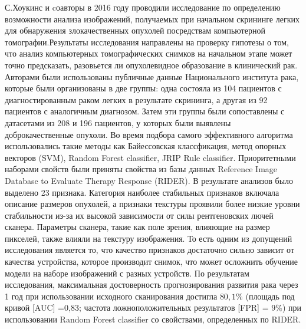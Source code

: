 \documentclass[14pt, a4paper]{extarticle}
\begin{document}
С.Хоукинс и cоавторы \cite{hawkins2016predicting} в 2016 году проводили исследование по определению возможности анализа изображений, получаемых при начальном скрининге легких для обнаружения злокачественных опухолей посредствам компьютерной томографии.Результаты исследования направлены на проверку гипотезы о том, что  анализ компьютерных томографических снимков на начальном этапе может точно предсказать, разовьется ли  опухолевидное образование в клинический рак. Авторами были использованы публичные данные Национального института рака, которые были организованы в две группы: одна состояла из 104 пациентов с диагностированным раком легких в результате скрининга, а другая из 92 пациентов с аналогичным диагнозом. Затем эти группы были сопоставлены с датасетами из 208 и 196 пациентов, у которых были выявлены доброкачественные
опухоли. Во время подбора самого эффективного алгоритма использовались такие методы как Байессовская классфикация, метод опорных векторов (SVM), Random Forest classifier, JRIP Rule classifier. Приоритетными наборами свойств были приняты свойства из базы данных Reference Image Database to Evaluate Therapy Response (RIDER). В результате анализов было выделено 23 признака. Категория наиболее стабильных признаков включала описание размеров опухолей, а признаки текстуры проявили более низкие уровни стабильности из-за их высокой зависимости от силы рентгеновских лючей сканера. Параметры сканера, такие как поле зрения, влияющие на размер пикселей, также влияли на текстуру изображения. То есть одним из допущений исследования является то, что качество признаков достаточно сильно зависит от качества устройства, которое производит снимок, что может осложнить обучение модели на наборе изображений с разных устройств. По результатам исследования, максимальная достоверность прогнозирования развития рака через 1 год при использовании
исходного сканирования достигла $80,1 \%$ (площадь под кривой [AUC] =0,83; частота ложноположительных результатов [FPR] = $9\%$) при использовании Random Forest classifier со свойствами, определенных по RIDER.
\end{document}
